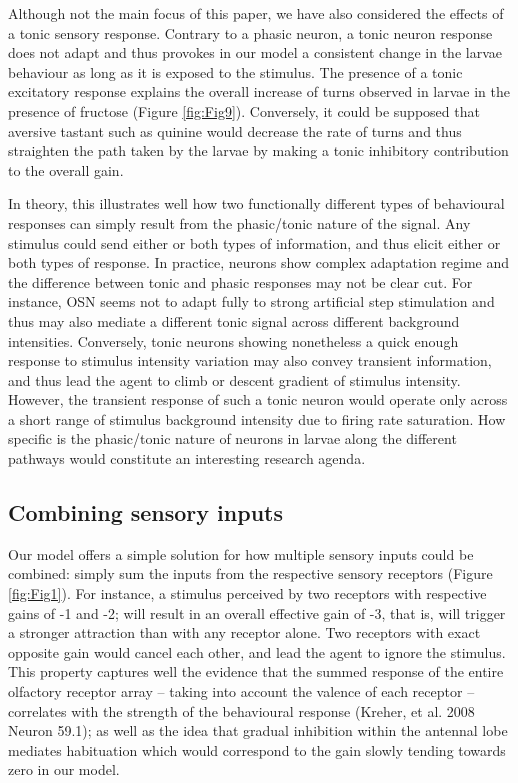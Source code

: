 \documentclass[10pt,a4paper]{article}
\begin{document}
Although not the main focus of this paper, we have also considered the effects of a tonic sensory response. Contrary to a phasic neuron, a tonic neuron response does not adapt and thus provokes in our model a consistent change in the larvae behaviour as long as it is exposed to the stimulus. The presence of a tonic excitatory response explains the overall increase of turns observed in larvae in the presence of fructose (Figure \ref{fig:Fig9}). Conversely, it could be supposed that aversive tastant such as quinine would decrease the rate of turns and thus straighten the path taken by the larvae by making a tonic inhibitory contribution to the overall gain. 

In theory, this illustrates well how two functionally different types of behavioural responses can simply result from the phasic/tonic nature of the signal. Any stimulus could send either or both types of information, and thus elicit either or both types of response. In practice, neurons show complex adaptation regime and the difference between tonic and phasic responses may not be clear cut. For instance, OSN seems not to adapt fully to strong artificial step stimulation \citep{nagel2011biophysical,schulze2015dynamical} and thus may also mediate a different tonic signal across different background intensities. Conversely, tonic neurons showing nonetheless a quick enough response to stimulus intensity variation may also convey transient information, and thus lead the agent to climb or descent gradient of stimulus intensity. However, the transient response of such a tonic neuron would operate only across a short range of stimulus background intensity due to firing rate saturation. How specific is the phasic/tonic nature of neurons in larvae along the different pathways would constitute an interesting research agenda.

\subsection{Combining sensory inputs}
Our model offers a simple solution for how multiple sensory inputs could be combined: simply sum the inputs from the respective sensory receptors (Figure \ref{fig:Fig1}). For instance, a stimulus perceived by two receptors with respective gains of -1 and -2; will result in an overall effective gain of -3, that is, will trigger a stronger attraction than with any receptor alone. Two receptors with exact opposite gain would cancel each other, and lead the agent to ignore the stimulus. This property captures well the evidence that the summed response of the entire olfactory receptor array – taking into account the valence of each receptor – correlates with the strength of the behavioural response (Kreher, et al. 2008 Neuron 59.1); as well as the idea that gradual inhibition within the antennal lobe mediates habituation \citep{das2011plasticity} which would correspond to the gain slowly tending towards zero in our model. 
\end{document}
